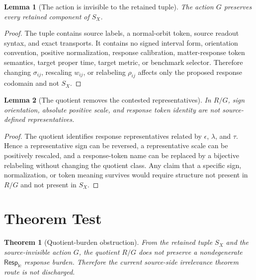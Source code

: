 \documentclass[11pt]{article}
\newcommand{\RespLC}{\mathsf{Resp}_{\mathrm{lc}}}
\newtheorem{lemma}{Lemma}
\newtheorem{theorem}{Theorem}
\begin{document}
\begin{lemma}[The action is invisible to the retained tuple]
The action \(G\) preserves every retained component of \(S_X\).
\end{lemma}

\begin{proof}
The tuple contains source labels, a normal-orbit token, source readout
syntax, and exact transports. It contains no signed interval form,
orientation convention, positive normalization, response calibration,
matter-response token semantics, target proper time, target metric, or
benchmark selector. Therefore changing \(\sigma_{ij}\), rescaling
\(w_{ij}\), or relabeling \(\rho_{ij}\) affects only the proposed
response codomain and not \(S_X\).
\end{proof}

\begin{lemma}[The quotient removes the contested representatives]
In \(R/G\), sign orientation, absolute positive scale, and response
token identity are not source-defined representatives.
\end{lemma}

\begin{proof}
The quotient identifies response representatives related by
\(\epsilon\), \(\lambda\), and \(\tau\). Hence a representative sign
can be reversed, a representative scale can be positively rescaled,
and a response-token name can be replaced by a bijective relabeling
without changing the quotient class. Any claim that a specific sign,
normalization, or token meaning survives would require structure not
present in \(R/G\) and not present in \(S_X\).
\end{proof}

\section{Theorem Test}

\begin{theorem}[Quotient-burden obstruction]
From the retained tuple \(S_X\) and the source-invisible action \(G\),
the quotient \(R/G\) does not preserve a nondegenerate
\(\RespLC\) response burden. Therefore the current source-side
irrelevance theorem route is not discharged.
\end{theorem}
\end{document}
